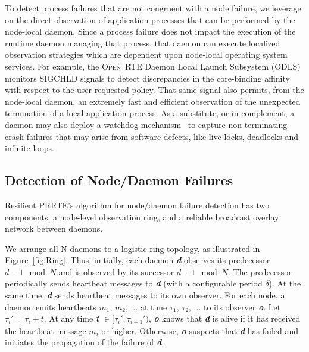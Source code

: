 \documentclass[sigconf]{acmart}
\newcommand{\prrte}[0]{\textsc{PRRTE}\xspace}
\newcommand{\orte}[0]{\textsc{Open~RTE}\xspace}
\begin{document}
To detect process failures that are not congruent with a node failure, we 
leverage on the direct observation of application processes that can be 
performed by the node-local daemon. Since a process failure does not 
impact the execution of the runtime daemon managing that process, that 
daemon can execute localized observation strategies which are dependent 
upon node-local operating system services. For example, the \orte Daemon 
Local Launch Subsystem (ODLS) monitors SIGCHLD signals to detect discrepancies 
in the core-binding affinity with respect to the user requested policy.
That same signal also permits, from the node-local daemon, an extremely fast and efficient observation
of the unexpected termination of a local application process. As a substitute, 
or in complement, a daemon may also deploy a watchdog mechanism~\cite{CASTAIN18} 
to capture non-terminating crash failures that may arise from software 
defects, like live-locks, deadlocks and infinite loops. 

\subsection{Detection of Node/Daemon Failures}

Resilient \prrte's algorithm for node/daemon failure detection has two
components: a node-level observation ring, and a reliable broadcast overlay network between daemons.

We arrange all N daemons to a logistic ring topology, as illustrated in Figure~\ref{fig:Ring}.
Thus, initially, each daemon \textbf{\textit{d}} observes its predecessor $d-1 \mod{N}$ and is observed by 
its successor $d+1 \mod{N}$. The predecessor periodically sends heartbeat messages to \textbf{\textit{d}} (with a 
configurable period $\delta$). At the same time, \textbf{\textit{d}} sends heartbeat messages to its own observer. For each node, a daemon emits heartbeats $m_1$, $m_2$, ... at time $\tau_1$, $\tau_2$, ... to its observer \textbf{\textit{o}}. Let $\tau_i' = \tau_i + t$. At any time \textbf{\textit{t}} $\in [\tau_i', \tau_{i+1}')$, \textbf{\textit{o}} knows that \textbf{\textit{d}} is alive if it has received the 
heartbeat message $m_i$ or higher. Otherwise, \textbf{\textit{o}} suspects that \textbf{\textit{d}} has failed and initiates the propagation of the
failure of \textbf{\textit{d}}.
\end{document}
